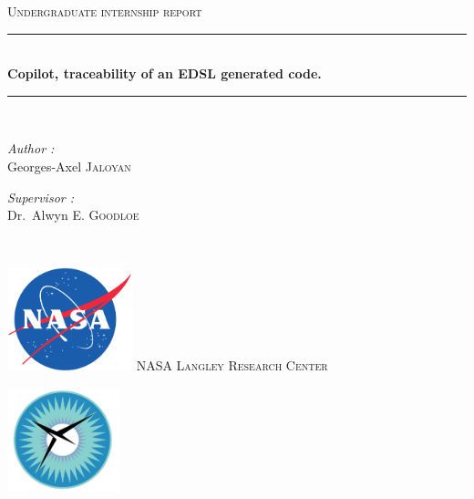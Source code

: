 \documentclass[a4paper,11pt,final]{article}
\newcommand{\reporttitle}{Copilot, traceability of an EDSL generated code.}     %
\newcommand{\reportauthor}{Georges-Axel \textsc{Jaloyan}} %
\newcommand{\reportsubject}{Undergraduate internship report} %
\newcommand{\HRule}{\rule{\linewidth}{0.5mm}}
\begin{document}
  
  \begin{titlepage}
  	
  	\begin{center}
  		
  		
  		\textsc{\Large \reportsubject}\\[0.5cm]
  		\HRule \\[0.4cm]
  		{\huge \bfseries \reporttitle}\\[0.4cm]
  		\HRule \\[1.5cm]
  		
  		\begin{minipage}[t]{0.3\textwidth}
  			\begin{flushleft} \large
  				\emph{Author :}\\
  				\reportauthor
  			\end{flushleft}
  		\end{minipage}
  		\begin{minipage}[t]{0.6\textwidth}
  			\begin{flushright} \large
  				\emph{Supervisor :} \\
  				Dr.~Alwyn \textsc{E. Goodloe}
  			\end{flushright}
  		\end{minipage}
  		\\[1.5cm]
  		\begin{minipage}[t]{0.25\textwidth}
  			\begin{flushleft}
  				\includegraphics[height=30mm]{images/NASA.png}	
  				\textsc{\LARGE NASA Langley Research Center}
  			\end{flushleft}
  		\end{minipage}
  		\begin{minipage}[t]{0.25\textwidth}
  		  	\begin{flushleft}
  		  		\includegraphics[height=30mm]{images/NIA-logo.jpg}

\end{flushleft}
\end{minipage}
\end{center}
\end{titlepage}
\end{document}

